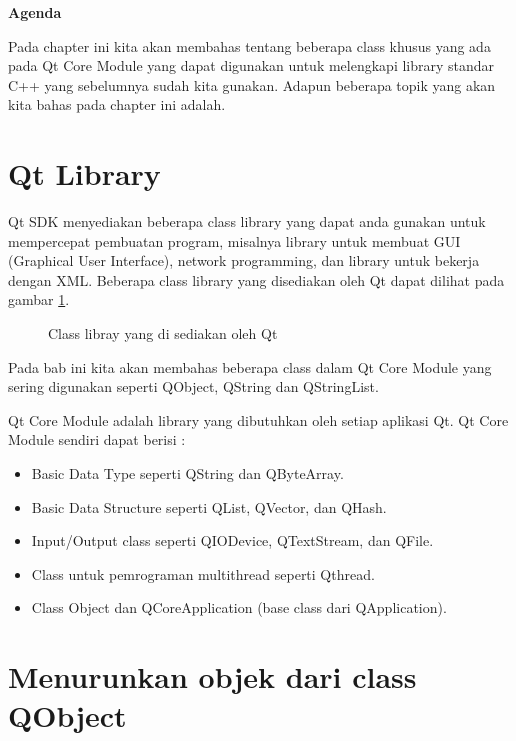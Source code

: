 \textbf{Agenda}

Pada chapter ini kita akan membahas tentang beberapa class khusus yang
ada pada Qt Core Module yang dapat digunakan untuk melengkapi library
standar C++ yang sebelumnya sudah kita gunakan. Adapun beberapa topik
yang akan kita bahas pada chapter ini adalah.

\minitoc

\section{Qt Library}\label{qt-library-1}

Qt SDK menyediakan beberapa class library yang dapat anda gunakan untuk
mempercepat pembuatan program, misalnya library untuk membuat GUI
(Graphical User Interface), network programming, dan library untuk
bekerja dengan XML. Beberapa class library yang disediakan oleh Qt dapat
dilihat pada gambar \ref{fig:qt-library}.

\begin{figure}[htbp]
\centering
{}
\caption{Class libray yang di sediakan oleh Qt}
\label{fig:qt-library}
\end{figure}


Pada bab ini kita akan membahas beberapa class dalam Qt Core Module
yang sering digunakan seperti QObject, QString 
dan QStringList.

Qt Core Module adalah library yang dibutuhkan oleh setiap aplikasi Qt.
Qt Core Module sendiri dapat berisi :

\begin{itemize}

\item
  Basic Data Type seperti QString dan QByteArray.
\item
  Basic Data Structure seperti QList, QVector, dan QHash.
\item
  Input/Output class seperti QIODevice, QTextStream, dan QFile.
\item
  Class untuk pemrograman multithread seperti Qthread.
\item
  Class Object dan QCoreApplication (base class dari QApplication).
\end{itemize}

\section{Menurunkan objek dari class QObject}\label{menurunkan-objek-dari-class-qobject}

